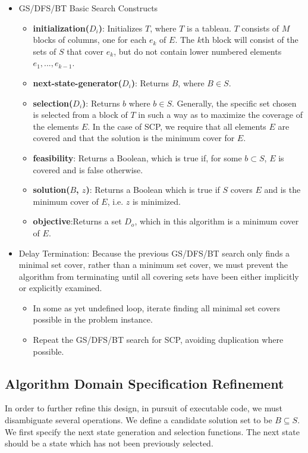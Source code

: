 \documentclass[12pt]{article}
\begin{document}
\begin{itemize}
	\item GS/DFS/BT Basic Search Constructs
	\begin{itemize}
		\item \textbf{initialization($D_i$)}: Initializes $T$, where $T$ is a tableau. $T$ consists of $M$ blocks of columns, one for each $e_k$ of $E$. The $k$th block will consist of the sets of $S$ that cover $e_k$, but do not contain lower numbered elements $e_1,...,e_{k-1}$.	
		\item \textbf{next-state-generator($D_i$)}: Returns $B$, where $B \in S$.
		\item \textbf{selection($D_i$)}: Returns $b$ where $b \in S$. Generally, the specific set chosen is selected from a block of $T$ in such a way as to maximize the coverage of the elements $E$. In the case of SCP, we require that all elements $E$ are covered and that the solution is the minimum cover for $E$.
		\item \textbf{feasibility}: Returns a Boolean, which is true if, for some $b \subset S$, $E$ is covered and is false otherwise.
		\item \textbf{solution($B$, $z$)}: Returns a Boolean which is true if $S$ covers $E$ and is the minimum cover of $E$, i.e. $z$ is minimized.
		\item \textbf{objective}:Returns a set $D_o$, which in this algorithm is a minimum cover of $E$.
	\end{itemize}
	\item Delay Termination: Because the previous GS/DFS/BT search only finds a minimal set cover, rather than a minimum set cover, we must prevent the algorithm from terminating until all covering sets have been either implicitly or explicitly examined.
	\begin{itemize}
		\item In some as yet undefined loop, iterate finding all minimal set covers possible in the problem instance.
		\item Repeat the GS/DFS/BT search for SCP, avoiding duplication where possible.
	\end{itemize}
\end{itemize}

\subsection{Algorithm Domain Specification Refinement}


In order to further refine this design, in pursuit of executable code, we must disambiguate several operations. We define a candidate solution set to be $B \subseteq S$. We first specify the next state generation and selection functions. The next state should be a state which has not been previously selected.
\end{document}
